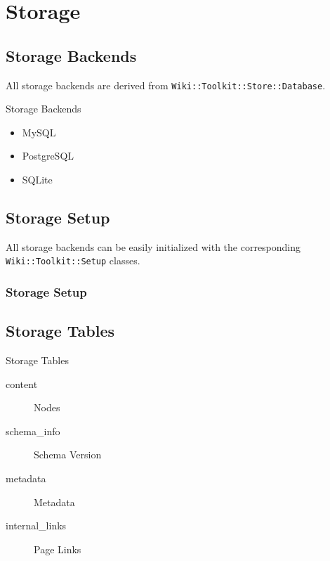 
\section{Storage}

\subsection{Storage Backends}

All storage backends are derived from \verb+Wiki::Toolkit::Store::Database+.

\begin{frame}{Storage Backends}
 \begin{itemize}
  \item MySQL
  \item PostgreSQL
  \item SQLite
 \end{itemize}
\end{frame}

\subsection{Storage Setup}


All storage backends can be easily initialized with the corresponding
\verb+Wiki::Toolkit::Setup+ classes.

\begin{frame}[fragile]
\frametitle{Storage Setup}

\end{frame}

\subsection{Storage Tables}

\begin{frame}{Storage Tables}
 \begin{description}
  \item [content] Nodes
  \item [schema\_info] Schema Version
  \item [metadata] Metadata
  \item [internal\_links] Page Links
 \end{description}
\end{frame}

